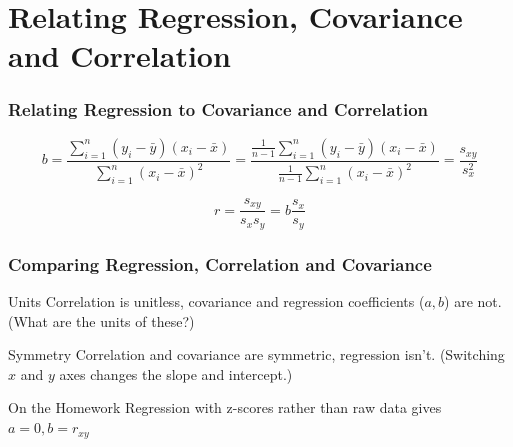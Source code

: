 \section{Relating Regression, Covariance and Correlation}
\begin{frame}
	\frametitle{Relating Regression to Covariance and Correlation}
		$$b = \frac{\sum_{i=1}^n \left(y_i - \bar{y}\right)\left(x_i - \bar{x} \right)}{\sum_{i=1}^n \left(x_i - \bar{x}\right)^2} = \frac{\frac{1}{n-1}\sum_{i=1}^n \left(y_i - \bar{y}\right)\left(x_i - \bar{x} \right)}{\frac{1}{n-1}\sum_{i=1}^n \left(x_i - \bar{x}\right)^2} = \frac{s_{xy}}{s_x^2}$$
		
		$$r = \frac{s_{xy}}{s_x s_y} = b \frac{s_x}{s_y}$$
		
\end{frame}
\begin{frame}
\frametitle{Comparing Regression, Correlation and Covariance}

\begin{block}{Units}
Correlation is unitless, covariance and regression coefficients ($a, b$) are not. (What are the units of these?)
\end{block}


\begin{block}{Symmetry}
Correlation and covariance are symmetric, regression isn't. (Switching $x$ and $y$ axes changes the slope and intercept.)
\end{block}

\begin{block}{On the Homework}
Regression with z-scores rather than raw data gives $a=0, b = r_{xy}$
\end{block}

\end{frame}

